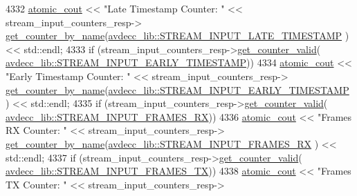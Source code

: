 \begin{DoxyCode}
4332                     \hyperlink{cmd__line_8h_a0bc38ccc65c79ba06c6fcd7b4bf554c3}{atomic\_cout} << \textcolor{stringliteral}{"Late Timestamp Counter: "} << stream\_input\_counters\_resp->
      \hyperlink{classavdecc__lib_1_1stream__input__counters__response_aad68050f63fc17c24527b3157d6ca8c7}{get\_counter\_by\_name}(\hyperlink{namespaceavdecc__lib_a831be56dba8ac423258a9374a1202df4a5c1b67849a2f0369eacd9cb0a34cd35b}{avdecc\_lib::STREAM\_INPUT\_LATE\_TIMESTAMP}
      ) << std::endl;
4333                 \textcolor{keywordflow}{if} (stream\_input\_counters\_resp->\hyperlink{classavdecc__lib_1_1stream__input__counters__response_a1a714d004a3ca8b521311ba4d3e62e93}{get\_counter\_valid}(
      \hyperlink{namespaceavdecc__lib_a831be56dba8ac423258a9374a1202df4a275f10a1321b0f35ad3a85706c9a2992}{avdecc\_lib::STREAM\_INPUT\_EARLY\_TIMESTAMP}))
4334                     \hyperlink{cmd__line_8h_a0bc38ccc65c79ba06c6fcd7b4bf554c3}{atomic\_cout} << \textcolor{stringliteral}{"Early Timestamp Counter: "} << stream\_input\_counters\_resp->
      \hyperlink{classavdecc__lib_1_1stream__input__counters__response_aad68050f63fc17c24527b3157d6ca8c7}{get\_counter\_by\_name}(\hyperlink{namespaceavdecc__lib_a831be56dba8ac423258a9374a1202df4a275f10a1321b0f35ad3a85706c9a2992}{avdecc\_lib::STREAM\_INPUT\_EARLY\_TIMESTAMP}
      ) << std::endl;
4335                 \textcolor{keywordflow}{if} (stream\_input\_counters\_resp->\hyperlink{classavdecc__lib_1_1stream__input__counters__response_a1a714d004a3ca8b521311ba4d3e62e93}{get\_counter\_valid}(
      \hyperlink{namespaceavdecc__lib_a831be56dba8ac423258a9374a1202df4ab39ecebabdd284a4a76d165ce5ed661d}{avdecc\_lib::STREAM\_INPUT\_FRAMES\_RX}))
4336                     \hyperlink{cmd__line_8h_a0bc38ccc65c79ba06c6fcd7b4bf554c3}{atomic\_cout} << \textcolor{stringliteral}{"Frames RX Counter: "} << stream\_input\_counters\_resp->
      \hyperlink{classavdecc__lib_1_1stream__input__counters__response_aad68050f63fc17c24527b3157d6ca8c7}{get\_counter\_by\_name}(\hyperlink{namespaceavdecc__lib_a831be56dba8ac423258a9374a1202df4ab39ecebabdd284a4a76d165ce5ed661d}{avdecc\_lib::STREAM\_INPUT\_FRAMES\_RX}
      ) << std::endl;
4337                 \textcolor{keywordflow}{if} (stream\_input\_counters\_resp->\hyperlink{classavdecc__lib_1_1stream__input__counters__response_a1a714d004a3ca8b521311ba4d3e62e93}{get\_counter\_valid}(
      \hyperlink{namespaceavdecc__lib_a831be56dba8ac423258a9374a1202df4a0b0a7b71f908ef6d8bbafd7d9a36ec57}{avdecc\_lib::STREAM\_INPUT\_FRAMES\_TX}))
4338                     \hyperlink{cmd__line_8h_a0bc38ccc65c79ba06c6fcd7b4bf554c3}{atomic\_cout} << \textcolor{stringliteral}{"Frames TX Counter: "} << stream\_input\_counters\_resp->

\end{DoxyCode}
